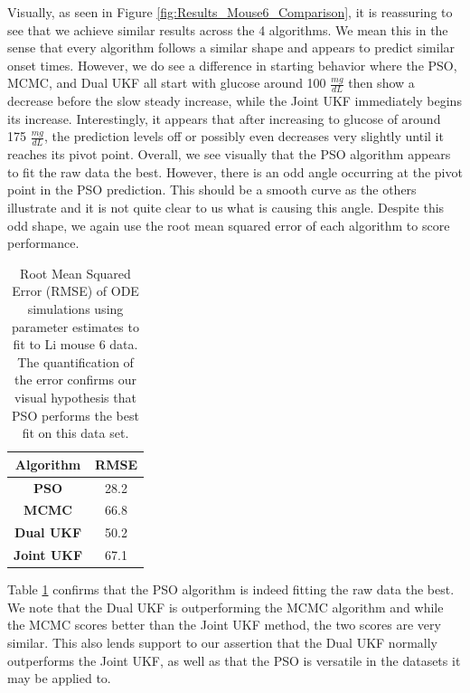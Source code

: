 Visually, as seen in Figure \ref{fig:Results_Mouse6_Comparison}, it is reassuring to see that we achieve similar results across the 4 algorithms. We mean this in the sense that every algorithm follows a similar shape and appears to predict similar onset times. However, we do see a difference in starting behavior where the PSO, MCMC, and Dual UKF all start with glucose around 100 $\frac{mg}{dL}$ then show a decrease before the slow steady increase, while the Joint UKF immediately begins its increase. Interestingly, it appears that after increasing to glucose of around 175 $\frac{mg}{dL}$, the prediction levels off or possibly even decreases very slightly until it reaches its pivot point. Overall, we see visually that the PSO algorithm appears to fit the raw data the best. However, there is an odd angle occurring at the pivot point in the PSO prediction. This should be a smooth curve as the others illustrate and it is not quite clear to us what is causing this angle. Despite this odd shape, we again use the root mean squared error of each algorithm to score performance.
\begin{table}[H]
  \begin{center}
    \begin{tabular}{c|c} %
      \textbf{Algorithm} & \textbf{RMSE} \\
      \hline
      \textbf{PSO} & 28.2\\
      \textbf{MCMC} & 66.8\\
      \textbf{Dual UKF} & 50.2\\
      \textbf{Joint UKF} & 67.1
    \end{tabular}
    \caption{Root Mean Squared Error (RMSE) of ODE simulations using parameter estimates to fit to Li mouse 6 data. The quantification of the error confirms our visual hypothesis that PSO performs the best fit on this data set.}
    \label{table:Results_Mouse6_RMSE}
  \end{center}
\end{table}
Table \ref{table:Results_Mouse6_RMSE} confirms that the PSO algorithm is indeed fitting the raw data the best. We note that the Dual UKF is outperforming the MCMC algorithm and while the MCMC scores better than the Joint UKF method, the two scores are very similar. This also lends support to our assertion that the Dual UKF normally outperforms the Joint UKF, as well as that the PSO is versatile in the datasets it may be applied to. 


